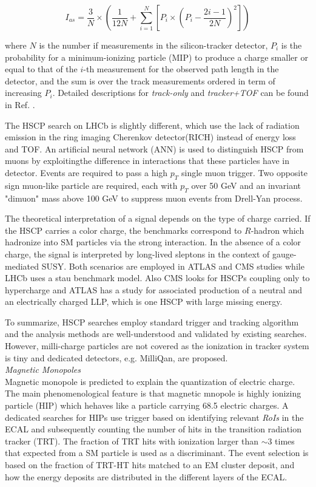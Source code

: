  \begin{equation}
     I_{as} = \frac{3}{N}\times(\frac{1}{12N}+\sum_{i=1}^{N}[P_{i}\times(P_{i}-\frac{2i-1}{2N})^2])
 \end{equation}
 
 where $N$ is the number if measurements in the silicon-tracker detector, $P_i$ is the probability for a minimum-ionizing particle (MIP) to produce a charge smaller or equal to that of the $i$-th measurement for the observed path length in the detector, and the sum is over the track measurements ordered in term of increasing $P_i$. Detailed descriptions for \textit{track-only} and \textit{tracker+TOF} can be found in Ref. \cite{CMSHSCP2016}.

The HSCP search on LHCb is slightly different, which use the lack of radiation emission in the ring imaging Cherenkov detector(RICH) instead of energy loss and TOF. An artificial neural network (ANN) is used to distinguish HSCP from muons by exploitingthe difference in interactions that these particles have in detector. Events are required to pass a high $p_T$ single muon trigger. Two opposite sign muon-like particle are required, each with $p_T$ over 50 GeV and an invariant "dimuon" mass above 100 GeV to suppress muon events from Drell-Yan process.
 
The theoretical interpretation of a signal depends on the type of charge carried. If the HSCP carries a color charge, the benchmarks correspond to $R$-hadron which hadronize into SM particles via the strong interaction. In the absence of a color charge, the signal is interpreted by long-lived sleptons in the context of gauge-mediated SUSY. Both scenarios are employed in ATLAS and CMS studies while LHCb uses a stau benchmark model.  Also CMS looks for HSCPs coupling only to hypercharge and ATLAS has a study for associated production of a neutral and an electrically charged LLP, which is one HSCP with large missing energy. 

To summarize, HSCP searches employ standard trigger and tracking algorithm  and the analysis methods are well-understood and validated by existing searches. However, milli-charge particles are not covered as the ionization in tracker system is tiny and  dedicated detectors, e.g. MilliQan, are proposed.\\

\textit{Magnetic Monopoles}\\

Magnetic monopole is predicted to explain the quantization of electric charge. The main phenomenological feature is that magnetic mnopole is highly ionizing particle (HIP) which hehaves like a particle carrying 68.5 electric charges. A dedicated searches for HIPs use trigger based on identifying relevant \textit{RoIs} in the ECAL and subsequently counting the number of hits in the transition radiation tracker (TRT). The fraction of TRT hits with ionization larger than $\sim 3$ times that expected from a SM particle is used as a discriminant. The event selection is based on the fraction of TRT-HT hits matched to an EM cluster deposit, and how the energy deposits are distributed in the different layers of the ECAL. 


